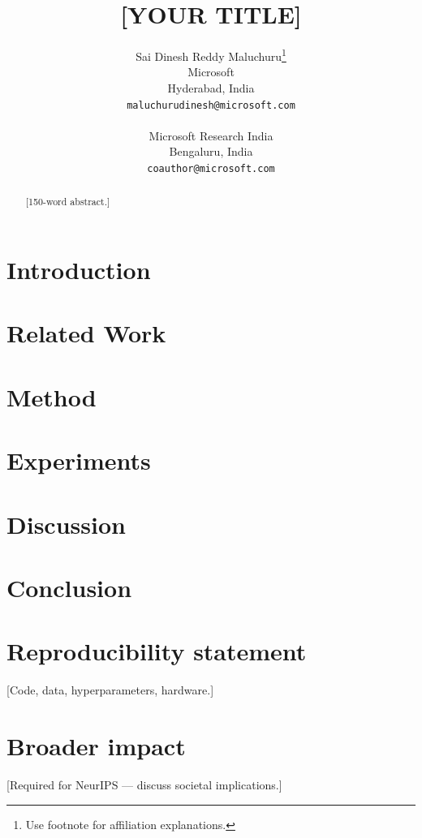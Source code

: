 \documentclass{article}
\title{[YOUR TITLE]}
\author{
  Sai Dinesh Reddy Maluchuru\thanks{Use footnote for affiliation explanations.} \\
  Microsoft \\
  Hyderabad, India \\
  \texttt{maluchurudinesh@microsoft.com} \\
  \And
  [Co-Author] \\
  Microsoft Research India \\
  Bengaluru, India \\
  \texttt{coauthor@microsoft.com}
}
\begin{document}
\maketitle

\begin{abstract}
[150-word abstract.]
\end{abstract}

\section{Introduction}
\section{Related Work}
\section{Method}
\section{Experiments}
\section{Discussion}
\section{Conclusion}

\section*{Reproducibility statement}
[Code, data, hyperparameters, hardware.]

\section*{Broader impact}
[Required for NeurIPS — discuss societal implications.]



\end{document}
